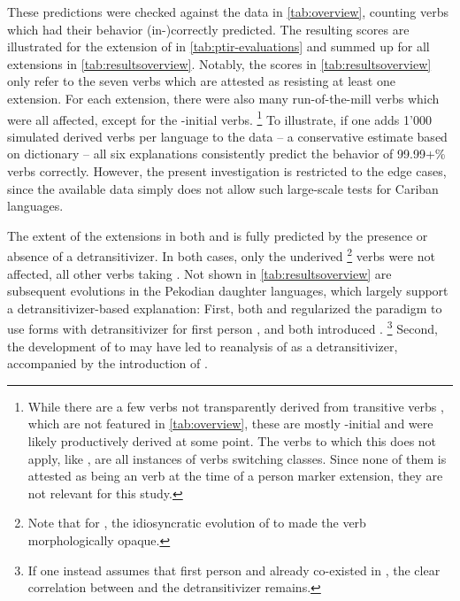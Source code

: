 

These predictions were checked against the data in \cref{tab:overview}, counting verbs which had their behavior (in-)correctly predicted.
The resulting scores are illustrated for the extension of \PTir {} in \cref{tab:ptir-evaluations} and summed up for all extensions in \cref{tab:resultsoverview}.
Notably, the scores in \cref{tab:resultsoverview} only refer to the seven verbs which are attested as resisting at least one extension.
For each extension, there were also many run-of-the-mill  verbs which were all affected, except for the \akuriyo {}-initial verbs.%
\footnote{While there are a few  verbs not transparently derived from transitive verbs \parencites[252]{triomeira1999}[222]{meira2000split}[30]{gildea2007greenberg}, which are not featured in \cref{tab:overview}, these are mostly -initial and were likely productively derived at some point.
	The verbs to which this does not apply, like \trio {}  \parencites[252]{triomeira1999}, are all instances of  verbs switching classes.
	Since none of them is attested as being an  verb at the time of a person marker extension, they are not relevant for this study.}
To illustrate, if one adds 1'000 simulated derived  verbs per language to the data -- a conservative estimate based on  \kalina dictionary -- all six explanations consistently predict the behavior of 99.99+\% verbs correctly.
However, the present investigation is restricted to the edge cases, since the available data simply does not allow such large-scale tests for Cariban languages.




The extent of the extensions in both \PWai and \PPek is fully predicted by the presence or absence of a detransitivizer.
In both cases, only the underived%
\footnote{Note that for \PPek, the idiosyncratic evolution of   to   made the verb morphologically opaque.}
 verbs were not affected, all other  verbs taking .
Not shown in \cref{tab:resultsoverview} are subsequent evolutions in the Pekodian daughter languages, which largely support a detransitivizer-based explanation:
First, both \ikpeng and \bakairi regularized the paradigm to use forms with detransitivizer for first person , and both introduced .%
\footnote{If one instead assumes that first person  and  already co-existed in \PPek, the clear correlation between  and the detransitivizer remains.}
Second, the development of \PPek {}  to \ikpeng {} may have led to reanalysis of  as a detransitivizer, accompanied by the introduction of .

